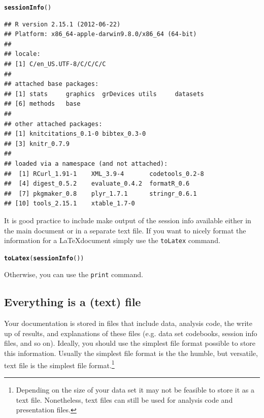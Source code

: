 \documentclass[ChapterTOCs,krantz1]{krantz}\usepackage{graphicx, color}
\makeatletter
\newcommand{\hlfunctioncall}[1]{\textcolor[rgb]{0.501960784313725,0,0.329411764705882}{\textbf{#1}}}%
\newenvironment{kframe}{%
 \def\at@end@of@kframe{}%
 \ifinner\ifhmode%
  \def\at@end@of@kframe{\end{minipage}}%
  \begin{minipage}{\columnwidth}%
 \fi\fi%
 \def\FrameCommand##1{\hskip\@totalleftmargin \hskip-\fboxsep
 \colorbox{shadecolor}{##1}\hskip-\fboxsep
     \hskip-\linewidth \hskip-\@totalleftmargin \hskip\columnwidth}%
 \MakeFramed {\advance\hsize-\width
   \@totalleftmargin\z@ \linewidth\hsize
   \@setminipage}}%
 {\par\unskip\endMakeFramed%
 \at@end@of@kframe}
\newenvironment{knitrout}{}{} %
\makeatother
\begin{document}
\begin{knitrout}
\color{fgcolor}\begin{kframe}
\begin{alltt}
\hlfunctioncall{sessionInfo}()
\end{alltt}
\begin{verbatim}
## R version 2.15.1 (2012-06-22)
## Platform: x86_64-apple-darwin9.8.0/x86_64 (64-bit)
## 
## locale:
## [1] C/en_US.UTF-8/C/C/C/C
## 
## attached base packages:
## [1] stats     graphics  grDevices utils     datasets 
## [6] methods   base     
## 
## other attached packages:
## [1] knitcitations_0.1-0 bibtex_0.3-0       
## [3] knitr_0.7.9        
## 
## loaded via a namespace (and not attached):
##  [1] RCurl_1.91-1    XML_3.9-4       codetools_0.2-8
##  [4] digest_0.5.2    evaluate_0.4.2  formatR_0.6    
##  [7] pkgmaker_0.8    plyr_1.7.1      stringr_0.6.1  
## [10] tools_2.15.1    xtable_1.7-0
\end{verbatim}
\end{kframe}
\end{knitrout}


\noindent It is good practice to include make output of the session info available either in the main document or in a separate text file. If you want to nicely format the information for a \LaTeX document simply use the {\tt{toLatex}} command.

\begin{knitrout}
\color{fgcolor}\begin{kframe}
\begin{alltt}
\hlfunctioncall{toLatex}(\hlfunctioncall{sessionInfo}())
\end{alltt}
\end{kframe}
\end{knitrout}


\noindent Otherwise, you can use the {\tt{print}} command. 

\subsection{Everything is a (text) file}

Your documentation is stored in files that include data, analysis code, the write up of results, and explanations of these files (e.g. data set codebooks, session info files, and so on). Ideally, you should use the simplest file format possible to store this information. Usually the simplest file format is the the humble, but versatile, text file is the simplest file format.\footnote{Depending on the size of your data set it may not be feasible to store it as a text file. Nonetheless, text files can still be used for analysis code and presentation files.} 
\end{document}
